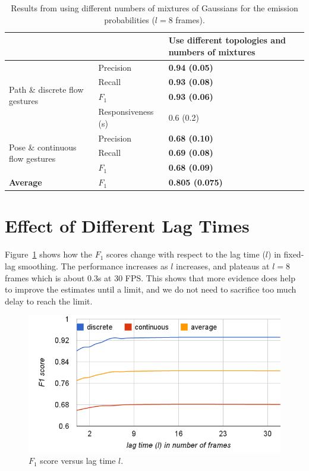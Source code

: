 \begin{table}[tbh]
\centering
\begin{tabular}{|p{4.5cm}|l|p{4cm}|}
\hline
& & \textbf{Use different topologies and numbers of mixtures} \\
\hline
\multirow{4}{4cm}{Path \& discrete flow gestures} 
& Precision & \textbf{0.94 (0.05)} \\
\cline{2-3}
& Recall    & \textbf{0.93 (0.08)} \\
\cline{2-3}
& $F_1$ & \textbf{0.93 (0.06)} \\
\cline{2-3}
& Responsiveness (s) & 0.6 (0.2)  \\
\hline
\multirow{3}{4cm}{Pose \& continuous flow gestures}
& Precision & \textbf{0.68 (0.10)} \\
\cline{2-3}
& Recall & \textbf{0.69 (0.08)} \\
\cline{2-3}
& $F_1$ & \textbf{0.68 (0.09)}  \\
\hline
\textbf{Average} & $F_1$ & \textbf{0.805 (0.075)}\\
\hline
\end{tabular}
\caption{Results from using different numbers of mixtures of Gaussians
for the emission probabilities ($l = 8$ frames).}
\label{tab:different-mixtures}
\end{table}


\section{Effect of Different Lag Times}
Figure~\ref{fig:lag} shows how the $F_1$ scores change with respect to the lag
time ($l$) in fixed-lag smoothing. The performance increases as $l$ increases, and
plateaus at $l=8$ frames which is about 0.3s at 30 FPS. This shows that more
evidence does help to improve the estimates until a limit, and we do not need to
sacrifice too much delay to reach the limit.

\begin{figure}[!tbh]
\centering
\includegraphics[trim=7mm 2mm 0 0mm, clip,
width=\columnwidth]{figures/f1_lag.png}
\caption{$F_1$ score versus lag time $l$.}
\label{fig:lag}
\end{figure}

